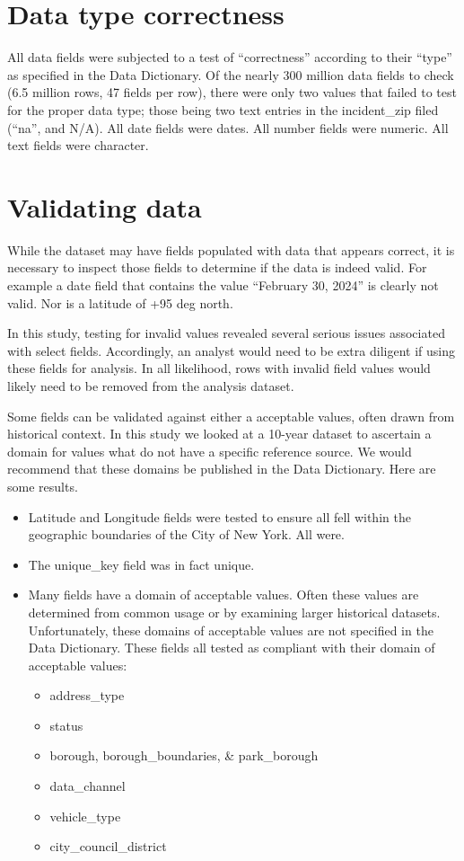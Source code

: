 \documentclass[12pt, titlepage]{article}
\begin{document}
\section{Data type correctness}

All data fields were subjected to a test of ``correctness'' according to their ``type'' as specified
in the Data Dictionary.  Of the nearly 300 million data fields to check (6.5 million rows, 47 fields per row), there were only two  values that failed to test for the
proper data type; those being two text entries in the incident\_zip filed (``na'', and N/A). All date fields were dates. All number fields were numeric. All text
fields were character.

 
 \section{Validating data}
 While the dataset may have fields populated with data that appears correct, it is necessary to inspect those fields to determine if the data is indeed valid. For
 example a date field that contains the value ``February 30, 2024'' is clearly not valid. Nor is a latitude of +95 deg north. 
 
 In this study, testing for invalid values revealed several serious issues associated with select fields. Accordingly, an analyst would need to be
extra diligent if using these fields for analysis. In all likelihood, rows with invalid field values would likely need to be removed from the
analysis dataset.

Some fields can be validated against either a acceptable values, often drawn from historical context. In this study we looked at a 10-year
dataset to ascertain a domain for values what do not have a specific reference source. We would recommend that these domains be published
in the Data Dictionary. Here are some results.

\begin{itemize}
	\item Latitude and Longitude fields were tested to ensure all fell within the geographic boundaries of the City of New York. All were.
	\item The unique\_key field was in fact unique.
	\item Many fields have a domain of acceptable values. Often these values are determined from common usage or by examining
	larger historical datasets. Unfortunately, these domains of acceptable values are not specified in the Data Dictionary. These fields all tested as
	compliant with their domain of acceptable values:
		\begin{itemize}
			\item address\_type
			\item status
			\item borough, borough\_boundaries, \& park\_borough 
			\item data\_channel
			\item vehicle\_type
			\item city\_council\_district
		\end{itemize}
\end{itemize}	
\end{document}

